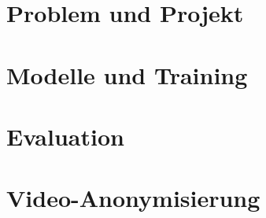 
\section{Problem und Projekt}













\section{Modelle und Training}













\section{Evaluation}













\section{Video-Anonymisierung}












